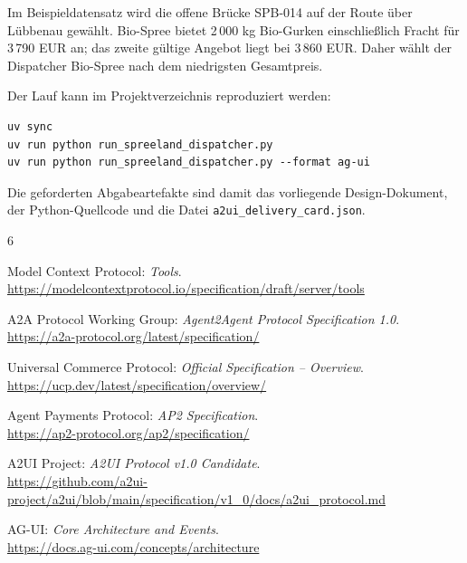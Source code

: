 \documentclass[11pt,a4paper]{article}
\begin{document}
Im Beispieldatensatz wird die offene Brücke SPB-014 auf der Route über
Lübbenau gewählt. Bio-Spree bietet 2\,000 kg Bio-Gurken einschließlich Fracht
für 3\,790 EUR an; das zweite gültige Angebot liegt bei 3\,860 EUR. Daher
wählt der Dispatcher Bio-Spree nach dem niedrigsten Gesamtpreis.

Der Lauf kann im Projektverzeichnis reproduziert werden:

\begin{lstlisting}
uv sync
uv run python run_spreeland_dispatcher.py
uv run python run_spreeland_dispatcher.py --format ag-ui
\end{lstlisting}

Die geforderten Abgabeartefakte sind damit das vorliegende Design-Dokument,
der Python-Quellcode und die Datei
\texttt{a2ui\_delivery\_card.json}.

\renewcommand{\refname}{Quellen}
\begin{thebibliography}{6}
\small

Model Context Protocol: \emph{Tools}.\\
\url{https://modelcontextprotocol.io/specification/draft/server/tools}

A2A Protocol Working Group: \emph{Agent2Agent Protocol Specification 1.0}.\\
\url{https://a2a-protocol.org/latest/specification/}

Universal Commerce Protocol: \emph{Official Specification -- Overview}.\\
\url{https://ucp.dev/latest/specification/overview/}

Agent Payments Protocol: \emph{AP2 Specification}.\\
\url{https://ap2-protocol.org/ap2/specification/}

A2UI Project: \emph{A2UI Protocol v1.0 Candidate}.\\
\url{https://github.com/a2ui-project/a2ui/blob/main/specification/v1_0/docs/a2ui_protocol.md}

AG-UI: \emph{Core Architecture and Events}.\\
\url{https://docs.ag-ui.com/concepts/architecture}

\end{thebibliography}
\end{document}
